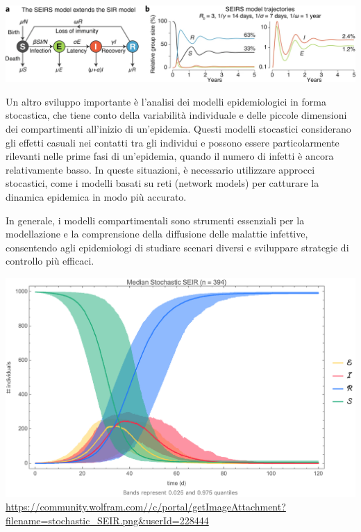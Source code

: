 \begin{minipage}{\linewidth}
    \centering
    \includegraphics[width=\textwidth]{img/41592_2020_856_Fig1_HTML.png}
    \label{fig:SEIRS_model}
\end{minipage}

Un altro sviluppo importante è l'analisi dei modelli epidemiologici in 
forma stocastica, che tiene conto della variabilità individuale e delle 
piccole dimensioni dei compartimenti all'inizio di un'epidemia. 
Questi modelli stocastici considerano gli effetti casuali nei contatti 
tra gli individui e possono essere particolarmente rilevanti nelle prime 
fasi di un'epidemia, quando il numero di infetti è ancora relativamente 
basso. In queste situazioni, è necessario utilizzare approcci stocastici, 
come i modelli basati su reti (network models) per catturare la dinamica 
epidemica in modo più accurato.

In generale, i modelli compartimentali sono strumenti essenziali per la 
modellazione e la comprensione della diffusione delle malattie infettive, 
consentendo agli epidemiologi di studiare scenari diversi e sviluppare 
strategie di controllo più efficaci.

\begin{minipage}{\linewidth}
    \centering
    \includegraphics[width=\textwidth]{img/stochastic_SEIR.png}
    \url{https://community.wolfram.com//c/portal/getImageAttachment?filename=stochastic_SEIR.png&userId=228444}
    \label{fig:stochastic_SEIR_model}
\end{minipage}